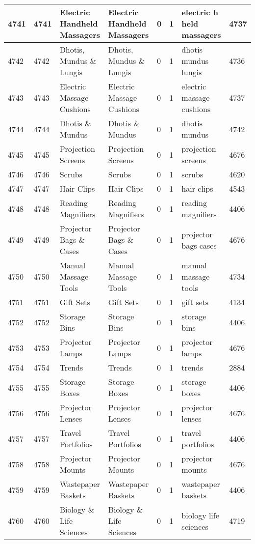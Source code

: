 \begin{longtable}{|l|l|l|l|l|l|l|l|}
4741 & 4741 & Electric Handheld Massagers & Electric Handheld Massagers & 0 & 1 & electric h held massagers & 4737 \\ \hline 
4742 & 4742 & Dhotis, Mundus \& Lungis & Dhotis, Mundus \& Lungis & 0 & 1 & dhotis mundus lungis & 4736 \\ \hline 
4743 & 4743 & Electric Massage Cushions & Electric Massage Cushions & 0 & 1 & electric massage cushions & 4737 \\ \hline 
4744 & 4744 & Dhotis \& Mundus & Dhotis \& Mundus & 0 & 1 & dhotis mundus & 4742 \\ \hline 
4745 & 4745 & Projection Screens & Projection Screens & 0 & 1 & projection screens & 4676 \\ \hline 
4746 & 4746 & Scrubs & Scrubs & 0 & 1 & scrubs & 4620 \\ \hline 
4747 & 4747 & Hair Clips & Hair Clips & 0 & 1 & hair clips & 4543 \\ \hline 
4748 & 4748 & Reading Magnifiers & Reading Magnifiers & 0 & 1 & reading magnifiers & 4406 \\ \hline 
4749 & 4749 & Projector Bags \& Cases & Projector Bags \& Cases & 0 & 1 & projector bags cases & 4676 \\ \hline 
4750 & 4750 & Manual Massage Tools & Manual Massage Tools & 0 & 1 & manual massage tools & 4734 \\ \hline 
4751 & 4751 & Gift Sets & Gift Sets & 0 & 1 & gift sets & 4134 \\ \hline 
4752 & 4752 & Storage Bins & Storage Bins & 0 & 1 & storage bins & 4406 \\ \hline 
4753 & 4753 & Projector Lamps & Projector Lamps & 0 & 1 & projector lamps & 4676 \\ \hline 
4754 & 4754 & Trends & Trends & 0 & 1 & trends & 2884 \\ \hline 
4755 & 4755 & Storage Boxes & Storage Boxes & 0 & 1 & storage boxes & 4406 \\ \hline 
4756 & 4756 & Projector Lenses & Projector Lenses & 0 & 1 & projector lenses & 4676 \\ \hline 
4757 & 4757 & Travel Portfolios & Travel Portfolios & 0 & 1 & travel portfolios & 4406 \\ \hline 
4758 & 4758 & Projector Mounts & Projector Mounts & 0 & 1 & projector mounts & 4676 \\ \hline 
4759 & 4759 & Wastepaper Baskets & Wastepaper Baskets & 0 & 1 & wastepaper baskets & 4406 \\ \hline 
4760 & 4760 & Biology \& Life Sciences & Biology \& Life Sciences & 0 & 1 & biology life sciences & 4719 \\ \hline 

\end{longtable}
